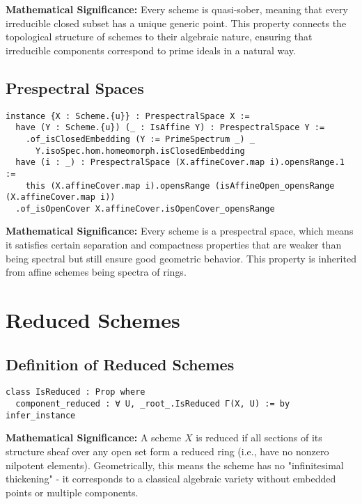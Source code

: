 \documentclass{article}
\theoremstyle{definition}
\begin{document}
\textbf{Mathematical Significance:} Every scheme is quasi-sober, meaning that every irreducible closed subset has a unique generic point. This property connects the topological structure of schemes to their algebraic nature, ensuring that irreducible components correspond to prime ideals in a natural way.

\subsection{Prespectral Spaces}

\begin{lstlisting}
instance {X : Scheme.{u}} : PrespectralSpace X :=
  have (Y : Scheme.{u}) (_ : IsAffine Y) : PrespectralSpace Y :=
    .of_isClosedEmbedding (Y := PrimeSpectrum _) _
      Y.isoSpec.hom.homeomorph.isClosedEmbedding
  have (i : _) : PrespectralSpace (X.affineCover.map i).opensRange.1 :=
    this (X.affineCover.map i).opensRange (isAffineOpen_opensRange (X.affineCover.map i))
  .of_isOpenCover X.affineCover.isOpenCover_opensRange
\end{lstlisting}

\textbf{Mathematical Significance:} Every scheme is a prespectral space, which means it satisfies certain separation and compactness properties that are weaker than being spectral but still ensure good geometric behavior. This property is inherited from affine schemes being spectra of rings.

\section{Reduced Schemes}

\subsection{Definition of Reduced Schemes}

\begin{lstlisting}
class IsReduced : Prop where
  component_reduced : ∀ U, _root_.IsReduced Γ(X, U) := by infer_instance
\end{lstlisting}

\textbf{Mathematical Significance:} A scheme $X$ is reduced if all sections of its structure sheaf over any open set form a reduced ring (i.e., have no nonzero nilpotent elements). Geometrically, this means the scheme has no "infinitesimal thickening" - it corresponds to a classical algebraic variety without embedded points or multiple components.
\end{document}
